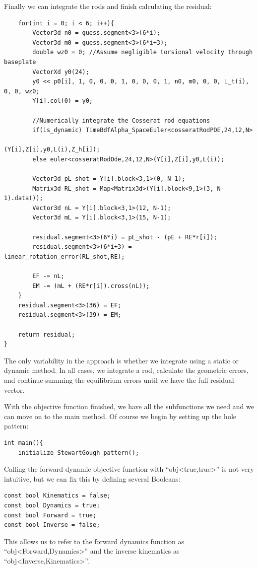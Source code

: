 \documentclass[12pt]{article}
\begin{document}
Finally we can integrate the rods and finish calculating the residual:
\begin{lstlisting}
    for(int i = 0; i < 6; i++){
        Vector3d n0 = guess.segment<3>(6*i);
        Vector3d m0 = guess.segment<3>(6*i+3);
        double wz0 = 0; //Assume negligible torsional velocity through baseplate
        VectorXd y0(24);
        y0 << p0[i], 1, 0, 0, 0, 1, 0, 0, 0, 1, n0, m0, 0, 0, L_t(i), 0, 0, wz0;
        Y[i].col(0) = y0;

        //Numerically integrate the Cosserat rod equations
        if(is_dynamic) TimeBdfAlpha_SpaceEuler<cosseratRodPDE,24,12,N>
                                              (Y[i],Z[i],y0,L(i),Z_h[i]);
        else euler<cosseratRodOde,24,12,N>(Y[i],Z[i],y0,L(i));

        Vector3d pL_shot = Y[i].block<3,1>(0, N-1);
        Matrix3d RL_shot = Map<Matrix3d>(Y[i].block<9,1>(3, N-1).data());
        Vector3d nL = Y[i].block<3,1>(12, N-1);
        Vector3d mL = Y[i].block<3,1>(15, N-1);

        residual.segment<3>(6*i) = pL_shot - (pE + RE*r[i]);
        residual.segment<3>(6*i+3) = linear_rotation_error(RL_shot,RE);

        EF -= nL;
        EM -= (mL + (RE*r[i]).cross(nL));
    }
    residual.segment<3>(36) = EF;
    residual.segment<3>(39) = EM;
		
    return residual;
}
\end{lstlisting}
The only variability in the approach is whether we integrate using a static or dynamic method. In all cases, we integrate a rod, calculate the geometric errors, and continue summing the equilibrium errors until we have the full residual vector.

With the objective function finished, we have all the subfunctions we need and we can move on to the main method. Of course we begin by setting up the hole pattern:
\begin{lstlisting}
int main(){
    initialize_StewartGough_pattern();
\end{lstlisting}
Calling the forward dynamic objective function with ``obj<true,true>'' is not very intuitive, but we can fix this by defining several Booleans:
\begin{lstlisting}
const bool Kinematics = false;
const bool Dynamics = true;
const bool Forward = true;
const bool Inverse = false;
\end{lstlisting}
This allows us to refer to the forward dynamics function as ``obj<Forward,Dynamics>'' and the inverse kinematics as ``obj<Inverse,Kinematics>''.
\end{document}
